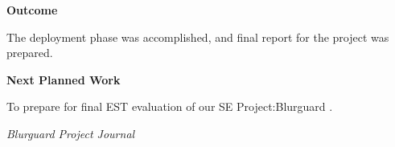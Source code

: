 \documentclass[12pt,a4paper]{article}
\begin{document}
\textbf{\large Outcome}

\vspace{4pt}

The deployment phase was accomplished, and final report for the project was prepared.

\vspace{8pt}


\textbf{\large Next Planned Work}

\vspace{4pt}

To prepare for final EST evaluation of our SE Project:Blurguard .

\vfill


\begin{flushright}
    \textit{Blurguard Project Journal}
\end{flushright}
\end{document}
